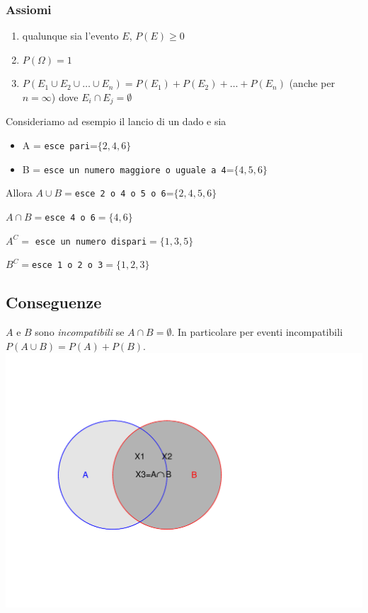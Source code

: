 \documentclass[onecolumn,12pt]{book}\usepackage[]{graphicx}\usepackage[]{color}
\makeatletter
\def\maxwidth{ %
  \ifdim\Gin@nat@width>\linewidth
    \linewidth
  \else
    \Gin@nat@width
  \fi
}
\newenvironment{knitrout}{}{} %
\makeatother
\begin{document}
\subsubsection{ Assiomi}
\begin{enumerate}
\item qualunque sia l'evento $E$, $P(E)\geq 0$
\item $P(\Omega)=1$
\item  $P(E_1\cup E_2\cup\ldots \cup E_n)=P(E_1)+P(E_2)+\ldots +P(E_n)$ (anche per $n=\infty$) dove $E_i\cap E_j=\emptyset$
\end{enumerate}

Consideriamo ad esempio il lancio di un dado e sia
\begin{itemize}
\item  A = \texttt{esce pari}=$\{2,4,6\}$
\item  B = \texttt{esce un numero maggiore o uguale a 4}=$\{4,5,6\}$
\end{itemize}


Allora
$A\cup B=$\texttt{esce 2 o 4 o 5 o 6}=$\{2,4,5,6\}$

$A\cap B=$\texttt{esce 4 o 6}$=\{4,6\}$

$A^C=$ \texttt{esce un numero dispari}$=\{1,3,5\}$

$B^C=$\texttt{esce 1 o 2 o 3}$=\{1,2,3\}$
        
        
\subsection{Conseguenze}   


   
$A$ e $B$ sono \emph{incompatibili} se $A\cap B=\emptyset$.
In particolare per eventi incompatibili
$P(A\cup B)=P(A)+P(B)$.
\begin{knitrout}
\color{fgcolor}
\includegraphics[width=\maxwidth]{figure/unnamed-chunk-4-1} 

\end{knitrout}
\end{document}
